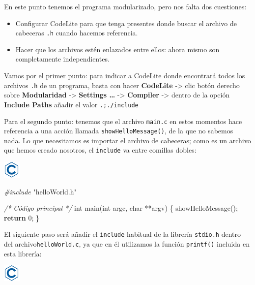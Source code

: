 \documentclass[
]{book}
\newenvironment{Shaded}{\begin{snugshade}}{\end{snugshade}}
\newcommand{\CommentTok}[1]{\textcolor[rgb]{0.56,0.35,0.01}{\textit{#1}}}
\newcommand{\ControlFlowTok}[1]{\textcolor[rgb]{0.13,0.29,0.53}{\textbf{#1}}}
\newcommand{\DataTypeTok}[1]{\textcolor[rgb]{0.13,0.29,0.53}{#1}}
\newcommand{\DecValTok}[1]{\textcolor[rgb]{0.00,0.00,0.81}{#1}}
\newcommand{\ImportTok}[1]{#1}
\newcommand{\NormalTok}[1]{#1}
\newcommand{\PreprocessorTok}[1]{\textcolor[rgb]{0.56,0.35,0.01}{\textit{#1}}}
\providecommand{\tightlist}{%
  \setlength{\itemsep}{0pt}\setlength{\parskip}{0pt}}
\begin{document}
En este punto tenemos el programa modularizado, pero nos falta dos cuestiones:

\begin{itemize}
\tightlist
\item
  Configurar CodeLite para que tenga presentes donde buscar el archivo de cabeceras \texttt{.h} cuando hacemos referencia.
\item
  Hacer que los archivos estén enlazados entre ellos: ahora mismo son completamente independientes.
\end{itemize}

Vamos por el primer punto: para indicar a CodeLite donde encontrará todos los archivos \texttt{.h} de un programa, basta con hacer \textbf{CodeLite} -\textgreater{} clic botón derecho sobre \textbf{Modularidad} -\textgreater{} \textbf{Settings \ldots{}} -\textgreater{} \textbf{Compiler} -\textgreater{} dentro de la opción \textbf{Include Paths} añadir el valor \texttt{.;./include}

Para el segundo punto: tenemos que el archivo \texttt{main.c} en estos momentos hace referencia a una acción llamada \texttt{showHelloMessage()}, de la que no sabemos nada. Lo que necesitamos es importar el archivo de cabeceras; como es un archivo que hemos creado nosotros, el \texttt{include} va entre comillas dobles:

\includegraphics{./img/c.png}

\begin{Shaded}
\begin{Highlighting}[]
\PreprocessorTok{\#include }\ImportTok{"helloWorld.h"}

\CommentTok{/* Código principal */}
\DataTypeTok{int}\NormalTok{ main(}\DataTypeTok{int}\NormalTok{ argc, }\DataTypeTok{char}\NormalTok{ **argv) \{}
\NormalTok{    showHelloMessage();}
    \ControlFlowTok{return} \DecValTok{0}\NormalTok{;}
\NormalTok{\}}
\end{Highlighting}
\end{Shaded}

El siguiente paso será añadir el \texttt{include} habitual de la librería \texttt{stdio.h} dentro del archivo\texttt{helloWorld.c}, ya que en él utilizamos la función \texttt{printf()} incluida en esta librería:

\includegraphics{./img/c.png}
\end{document}
